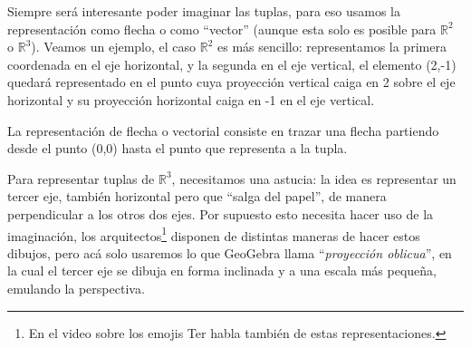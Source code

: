\documentclass[12pt]{book}
\def\R{\mathbb{R}}
\begin{document}
Siempre será interesante poder imaginar las tuplas, para eso usamos la representación como flecha o como ``vector'' (aunque esta solo es posible para $\R^2$ o $\R^3$).
Veamos un ejemplo, el caso $\R^2$ es más sencillo: representamos la primera coordenada en el eje horizontal, y la segunda en el eje vertical, el elemento (2,-1) quedará representado en el punto cuya proyección vertical caiga en 2 sobre el eje horizontal y su proyección horizontal caiga en -1 en el eje vertical.

\begin{center}
\end{center}

La representación de flecha o vectorial consiste en trazar una flecha partiendo desde el punto (0,0) hasta el punto que representa a la tupla.

Para representar tuplas de $\R^3$, necesitamos una astucia: la idea es representar un tercer eje, también horizontal pero que ``salga del papel'', de manera perpendicular a los otros dos ejes.
Por supuesto esto necesita hacer uso de la imaginación, los arquitectos\footnote{En el video sobre los emojis Ter habla también de estas representaciones.} disponen de distintas maneras de hacer estos dibujos, pero acá solo usaremos lo que GeoGebra llama ``\emph{proyección oblicua}'', en la cual el tercer eje se dibuja en forma inclinada y a una escala más pequeña, emulando la perspectiva.
\end{document}
